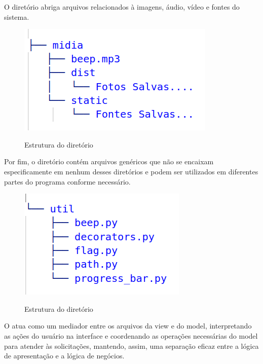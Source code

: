 O diretório  abriga arquivos relacionados à imagens, áudio, vídeo e fontes do sistema.

\begin{figure}[H]
	\centering
	\caption{Estrutura do diretório }
	\includegraphics[scale=0.5]{figuras/diretorios/midia.png}
	\label{fig:midia}
\end{figure}

Por fim, o diretório  contém arquivos genéricos que não se encaixam especificamente em nenhum desses diretórios e podem ser utilizados em diferentes partes do programa conforme necessário.

\begin{figure}[H]
	\centering
    \caption{Estrutura do diretório }
	\includegraphics[scale=0.5]{figuras/diretorios/util.png}
	\label{fig:util}
\end{figure}

O  atua como um mediador entre os arquivos da view e do model, interpretando as ações do usuário na interface e coordenando as operações necessárias do model para atender às solicitações, mantendo, assim, uma separação eficaz entre a lógica de apresentação e a lógica de negócios.


